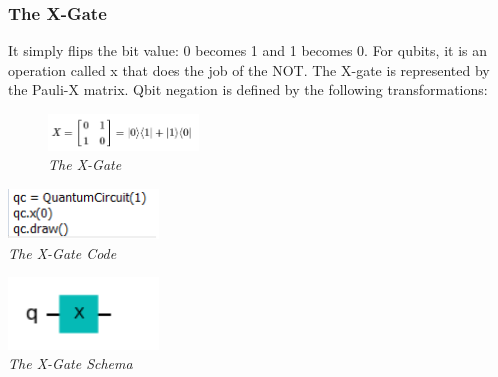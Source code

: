 \documentclass{article}
\begin{document}
\subsubsection{The X-Gate}
It simply flips the bit value: 0 becomes 1 and 1 becomes 0. For qubits, it is an operation called x that does the job of the NOT.
The X-gate is represented by the Pauli-X matrix.
Qbit negation is defined by the following transformations:
\begin{figure}[h]
\begin{center}
\begin{minipage}[b]{4cm}
\centering
\includegraphics[width=4cm]{x_gate.png}\\\textit{The X-Gate}
\end{minipage}
\end{center}
\end{figure}
\begin{mdframed}
\begin{center}
\begin{minipage}[b]{4cm}
\centering
\includegraphics[width=4cm]{x_code.png}\\\textit{The X-Gate Code}
\end{minipage}
\begin{minipage}[b]{4cm}
\centering
\includegraphics[width=4cm]{x_gate_schema.png}\\\textit{The X-Gate Schema}
\end{minipage}
\end{center}
\end{mdframed}
\end{document}
